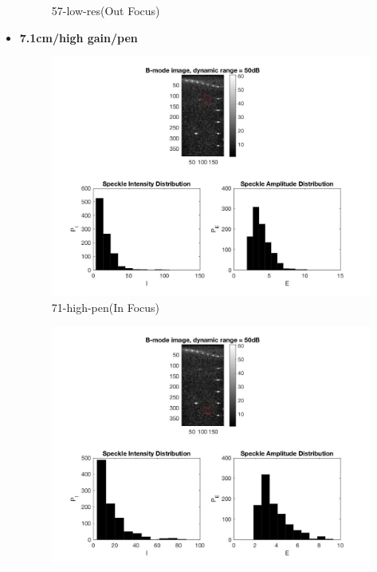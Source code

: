 \documentclass[12pts,a4paper]{article}
\begin{document}
\begin{itemize}
\begin{figure}[h]
    \caption{57-low-res(Out Focus)}
    \label{fig:mesh1}
\end{figure}
\pagebreak
\item{\textbf{7.1cm/high gain/pen}}
\begin{center}
\end{center}
\begin{figure}[h]
    \centering
    \includegraphics[width=1.0\textwidth]{img_hw2/71-high-pen1.jpg}
    \caption{71-high-pen(In Focus)}
    \label{fig:mesh1}
\end{figure}
\pagebreak
\begin{figure}[h]
    \centering
    \includegraphics[width=1.0\textwidth]{img_hw2/71-high-pen2.jpg}

\end{figure}
\end{itemize}
\end{document}
